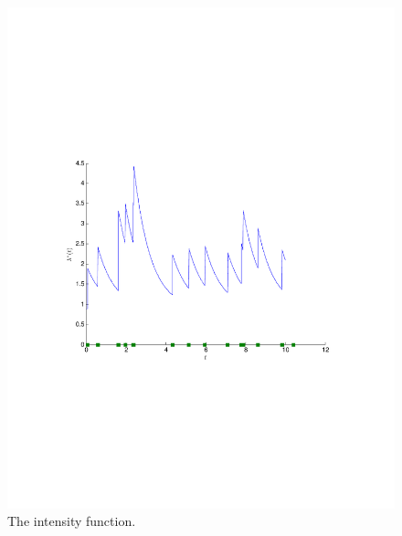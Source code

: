 \begin{figure}[H]
	\centering
	\includegraphics[trim = 0.8cm 8.5cm 0.8cm 8cm,clip,width=1.00\textwidth ]{Hawkess_ClusterIntensity.pdf}
	\caption{The intensity function.}
	\label{Example_ClusterIntensity}
\end{figure}